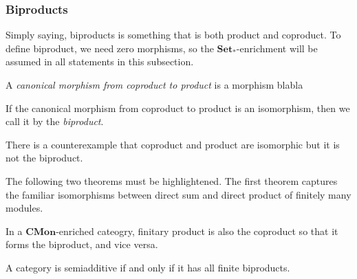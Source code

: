 \documentclass[a4paper]{article}
\begin{document}
\subsubsection{Biproducts}
Simply saying, biproducts is something that is both product and coproduct.
To define biproduct, we need zero morphisms, so the $\mathbf{Set_*}$-enrichment will be assumed in all statements in this subsection.
\begin{defn}
A \emph{canonical morphism from coproduct to product} is a morphism blabla
\end{defn}
\begin{defn}[Biproduct]
If the canonical morphism from coproduct to product is an isomorphism, then we call it by the \emph{biproduct}.
\end{defn}
There is a counterexample that coproduct and product are isomorphic but it is not the biproduct.




The following two theorems must be highlightened.
The first theorem captures the familiar isomorphisms between direct sum and direct product of finitely many modules.
\begin{thm}
In a $\mathbf{CMon}$-enriched cateogry, finitary product is also the coproduct so that it forms the biproduct, and vice versa.
\end{thm}

\begin{thm}
A category is semiadditive if and only if it has all finite biproducts.
\end{thm}
\end{document}
